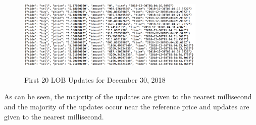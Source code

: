 \begin{figure}[t]
\begin{center}
\caption{First 20 LOB Updates for December 30, 2018}
\includegraphics[width=0.8\textwidth]{Figures/12_30_18_Updates.png}
\label{fig:12_30_18_Updates}
\end{center}
\end{figure}

As can be seen, the majority of the updates are given to the nearest millisecond and the majority of the updates occur near the reference price and updates are given to the nearest millisecond.